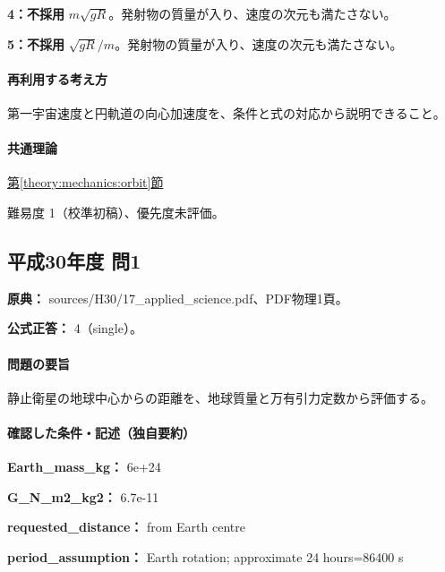 \noindent\textbf{4：不採用} \(m\sqrt{gR}\)。発射物の質量が入り、速度の次元も満たさない。\par

\noindent\textbf{5：不採用} \(\sqrt{gR}/m\)。発射物の質量が入り、速度の次元も満たさない。\par

\paragraph{再利用する考え方} 第一宇宙速度と円軌道の向心加速度を、条件と式の対応から説明できること。

\paragraph{共通理論} \hyperref[theory:mechanics:orbit]{第\ref*{theory:mechanics:orbit}節}

\par 難易度 1（校準初稿）、優先度未評価。

\subsection{平成30年度 問1}
\label{q:h30-reg-applied-01}

\noindent\textbf{原典：} sources/H30/17\_applied\_science.pdf、PDF物理1頁。

\textbf{公式正答：} 4（single）。

\paragraph{問題の要旨} 静止衛星の地球中心からの距離を、地球質量と万有引力定数から評価する。

\paragraph{確認した条件・記述（独自要約）}\mbox{}\par

\noindent\textbf{Earth\_mass\_kg：} 6e+24\par

\noindent\textbf{G\_N\_m2\_kg2：} 6.7e-11\par

\noindent\textbf{requested\_distance：} from Earth centre\par

\noindent\textbf{period\_assumption：} Earth rotation; approximate 24 hours=\allowbreak{}86400 s\par

